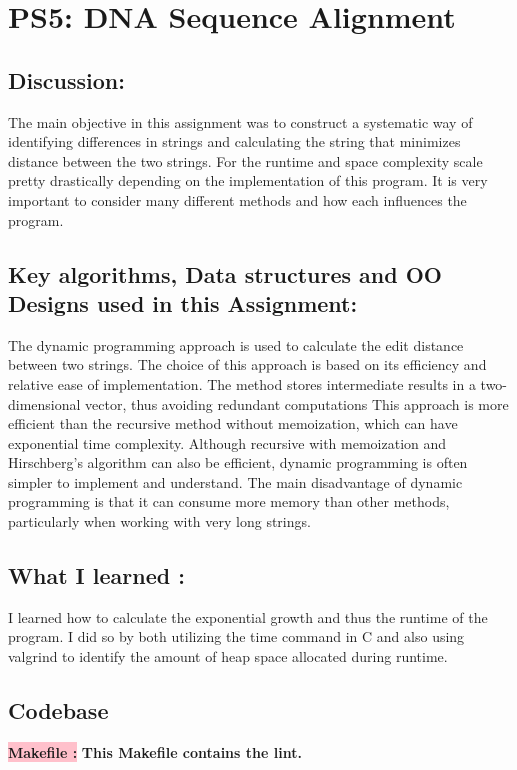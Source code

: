 \section{PS5: DNA Sequence Alignment}\label{sec:ps5}
\graphicspath{{ps5}}
\subsection{Discussion:}\label{sec:ps6:disc}
The main objective in this assignment was to construct a systematic way of identifying differences in strings and calculating the string that minimizes distance between the two strings. For the runtime and space complexity scale pretty drastically depending on the implementation of this program. It is very important to consider many different methods and how each influences the program. 

\subsection{Key algorithms, Data structures and OO Designs used in this Assignment:}
The dynamic programming approach is used to calculate the edit distance between two strings. 
The choice of this approach is based on its efficiency and relative ease of implementation. 
The method stores intermediate results in a two-dimensional vector, thus avoiding redundant computations
This approach is more efficient than the recursive method without memoization, which can have exponential time complexity. 
Although recursive with memoization and Hirschberg's algorithm can also be efficient, dynamic programming is often simpler to 
implement and understand. The main disadvantage of dynamic programming is that it can consume more memory than other methods, 
particularly when working with very long strings.



\subsection{What I learned :}
I learned how to calculate the exponential growth and thus the runtime of the program. I did so by both utilizing the time command in C and also using valgrind to identify the amount of heap space allocated during runtime. 
\subsection{Codebase}\label{sec:ps6:code}

\textbf{\colorbox{pink}{Makefile :}} \newline \textbf{This Makefile contains the lint.}


